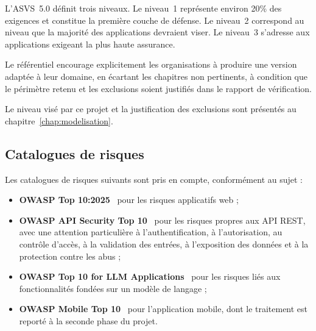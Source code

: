 L'ASVS~5.0 définit trois niveaux. Le niveau~1 représente environ 20\% des
exigences et constitue la première couche de défense. Le niveau~2 correspond au
niveau que la majorité des applications devraient viser. Le niveau~3 s'adresse
aux applications exigeant la plus haute assurance.

Le référentiel encourage explicitement les organisations à produire une version
adaptée à leur domaine, en écartant les chapitres non pertinents, à condition
que le périmètre retenu et les exclusions soient justifiés dans le rapport de
vérification.

Le niveau visé par ce projet et la justification des exclusions sont présentés
au chapitre~\ref{chap:modelisation}.

\subsection{Catalogues de risques}

Les catalogues de risques suivants sont pris en compte, conformément au sujet :

\begin{itemize}
  \item \textbf{OWASP Top 10:2025}~\cite{owasptop10} pour les risques
  applicatifs web ;
  \item \textbf{OWASP API Security Top 10}~\cite{owaspapi} pour les risques
  propres aux API REST, avec une attention particulière à l'authentification, à
  l'autorisation, au contrôle d'accès, à la validation des entrées, à
  l'exposition des données et à la protection contre les abus ;
  \item \textbf{OWASP Top 10 for LLM Applications}~\cite{owaspllm} pour les
  risques liés aux fonctionnalités fondées sur un modèle de langage ;
  \item \textbf{OWASP Mobile Top 10}~\cite{owaspmobile} pour l'application
  mobile, dont le traitement est reporté à la seconde phase du projet.
\end{itemize}
